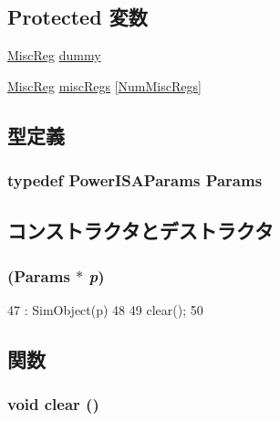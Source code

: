 \subsection*{Protected 変数}
\begin{DoxyCompactItemize}
\item 
\hyperlink{namespacePowerISA_aa16539aa6584fd12f7d6fa868f75b4de}{MiscReg} \hyperlink{classPowerISA_1_1ISA_a704962a15f81135239eba94c00e2b269}{dummy}
\item 
\hyperlink{namespacePowerISA_aa16539aa6584fd12f7d6fa868f75b4de}{MiscReg} \hyperlink{classPowerISA_1_1ISA_a1719a90e78518ac5e323ce1fb9fe3639}{miscRegs} \mbox{[}\hyperlink{namespacePowerISA_a568d4aa96dd7cd963f3b1b1b0446c9c6}{NumMiscRegs}\mbox{]}
\end{DoxyCompactItemize}


\subsection{型定義}
\hypertarget{classPowerISA_1_1ISA_aa026c2a3d58faf0c2fdd7af027f1cf55}{
\subsubsection[{Params}]{\setlength{\rightskip}{0pt plus 5cm}typedef PowerISAParams {\bf Params}}}
\label{classPowerISA_1_1ISA_aa026c2a3d58faf0c2fdd7af027f1cf55}


\subsection{コンストラクタとデストラクタ}
\hypertarget{classPowerISA_1_1ISA_ae9132e021b3f3b20c917fc328a056bbd}{
\subsubsection[{ISA}]{ ({\bf Params} $\ast$ {\em p})}}
\label{classPowerISA_1_1ISA_ae9132e021b3f3b20c917fc328a056bbd}



\begin{DoxyCode}
47     : SimObject(p)
48 {
49     clear();
50 }
\end{DoxyCode}


\subsection{関数}
\hypertarget{classPowerISA_1_1ISA_ac8bb3912a3ce86b15842e79d0b421204}{
\subsubsection[{clear}]{\setlength{\rightskip}{0pt plus 5cm}void clear ()}}
\label{classPowerISA_1_1ISA_ac8bb3912a3ce86b15842e79d0b421204}



